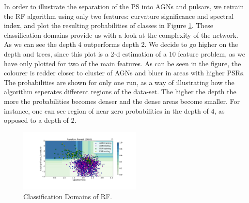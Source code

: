 In order to illustrate the separation of the PS into AGNs and pulsars, we retrain the RF algorithm using only two features: curvature significance and spectral index, and plot the resulting probabilities of classes in Figure \ref{fig:RF_domains}. These classification domains provide us with a look at the complexity of the network. As we can see the depth 4 outperforms depth 2. We decide to go higher on the depth and trees, since this plot is a 2-d estimation of a 10 feature problem, as we have only plotted for two of the main features. As can be seen in the figure, the colourer is redder closer to cluster of AGNs and bluer in areas with higher PSRs. The probabilities are shown for only one run, as a way of illustrating how the algorithm seperates different regions of the data-set. The higher the depth the more the probabilities becomes denser and the dense areas become smaller. For instance, one can see region of near zero probabilities in the depth of 4, as opposed to a depth of 2.  

\begin{figure}[h]
\centering
\hspace*{-2.5cm}
\includegraphics[width=0.55\textwidth,left]{plots/classification_domains/rf_50_6_final.pdf}
\caption{Classification Domains of RF.  }
\label{fig:RF_domains}
\end{figure}




